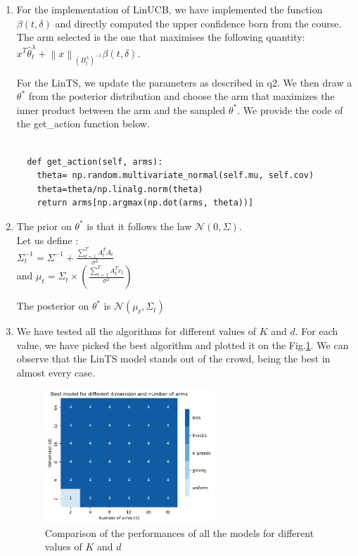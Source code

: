 \begin{enumerate}
    \item For the implementation of LinUCB, we have implemented the function $\beta(t,\delta)$ and directly computed the upper confidence born from the course. The arm selected is the one that maximises the following quantity: \\
     $x^T\hat{\theta }^\lambda _t + \left\lVert x\right\rVert _{(B_t^\lambda)^{-1} } \beta(t, \delta) $. 

    For the LinTS, we update the parameters as described in q2. We then draw a $\theta^*$ from the posterior distribution and choose the arm that maximizes the inner product between the arm and the sampled $\theta^*$.
    We provide the code of the get\_action function below.
    \begin{lstlisting}
        
  def get_action(self, arms):
    theta= np.random.multivariate_normal(self.mu, self.cov)
    theta=theta/np.linalg.norm(theta)
    return arms[np.argmax(np.dot(arms, theta))]
    \end{lstlisting}
    \item The prior on $\theta^*$ is that it follows the law $\mathcal{N}(0, \Sigma)$. \\
    
Let us define : \\
$\Sigma_t ^{-1} = \Sigma^{-1} + \frac{\sum_{t=1}^{T} A_t^T A_t}{\sigma^2}$ \\

and $\mu_t = \Sigma_t \times (\frac{\sum_{t=1}^{T} A_t^T r_t}{\sigma^2})$


The posterior on  $\theta^*$ is  $\mathcal{N}(\mu_t, \Sigma_t)$
    \item We have tested all the algorithms for different values of $K$ and $d$. For each value, we have picked the best algorithm and plotted it on the Fig.\ref{fig:best_models}. 
    We can observe that the LinTS model stands out of the crowd, being the best in almost every case. 

    \begin{figure}[h]
        \centering
        \includegraphics[width=0.6\textwidth]{images/best_model.png}
        \caption{Comparison of the performances of all the models for different values of $K$ and $d$}
        \label{fig:best_models}
    \end{figure}
\end{enumerate}

